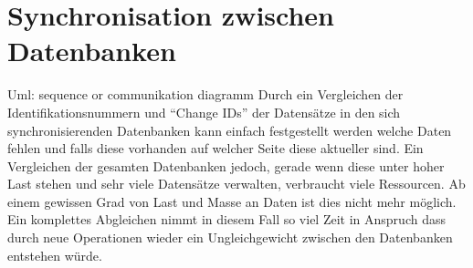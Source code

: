 \documentclass[a4paper,11pt,oneside,%
headsepline,												%
footsepline,												%
bibtotocnumbered									%
]{scrreprt}
\begin{document}
\section{Synchronisation zwischen Datenbanken}
\label{sec:eBTreeSynchronisation}
Uml: sequence or communikation diagramm
Durch ein Vergleichen der Identifikationsnummern und \enquote{Change IDs} der Datensätze in den sich synchronisierenden Datenbanken kann einfach festgestellt werden welche Daten fehlen und falls diese vorhanden auf welcher Seite diese aktueller sind. Ein Vergleichen der gesamten Datenbanken jedoch, gerade wenn diese unter hoher Last stehen und sehr viele Datensätze verwalten, verbraucht viele Ressourcen. Ab einem gewissen Grad von Last und Masse an Daten ist dies nicht mehr möglich. Ein komplettes Abgleichen nimmt in diesem Fall so viel Zeit in Anspruch dass durch neue Operationen wieder ein Ungleichgewicht zwischen den Datenbanken entstehen würde.\\
\end{document}
